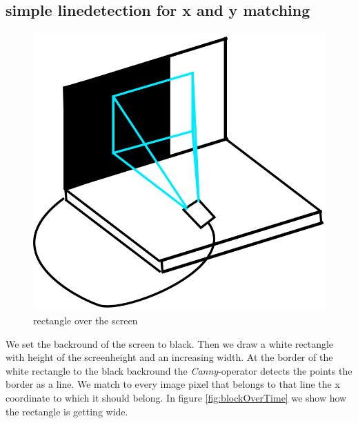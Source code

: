 \documentclass[journal,final,a4paper,twoside]{PS}
\begin{document}
\subsection{simple linedetection for x and y matching}

\begin{figure}[h]
\begin{center}
\includegraphics[scale=0.25]{./pics/rect.png}
\caption{rectangle over the screen}
\label{fig:setup}
\end{center}
\end{figure}

We set the backround of the screen to black. Then we draw a white rectangle with height of the screenheight and an increasing width. At the border of the white rectangle to the black backround the \emph{Canny}-operator detects the points the border as a line. We match to every image pixel that belongs to that line the x coordinate to which it should belong. In figure \ref{fig:blockOverTime} we show how the rectangle is getting wide.
\\
\end{document}
